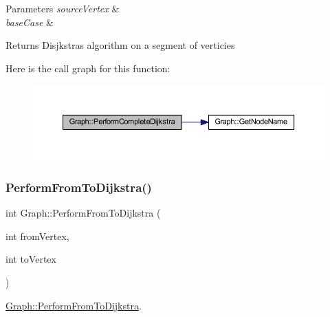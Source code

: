 \begin{DoxyParams}{Parameters}
{\em source\+Vertex} & \\
\hline
{\em base\+Case} & \\
\hline
\end{DoxyParams}
\begin{DoxyReturn}{Returns}
Disjkstra\textquotesingle{}s algorithm on a segment of verticies 
\end{DoxyReturn}
Here is the call graph for this function\+:
\nopagebreak
\begin{figure}[H]
\begin{center}
\leavevmode
\includegraphics[width=350pt]{class_graph_a3bb92a2d9cba33ba8e960eccb9c34f78_cgraph}
\end{center}
\end{figure}
\mbox{\label{class_graph_a3b0a495ac7703b4b7f12dc8e6e490f3b}} 
\subsubsection{\texorpdfstring{Perform\+From\+To\+Dijkstra()}{PerformFromToDijkstra()}}
{\footnotesize\ttfamily int Graph\+::\+Perform\+From\+To\+Dijkstra (\begin{DoxyParamCaption}\item[{int}]{from\+Vertex,  }\item[{int}]{to\+Vertex }\end{DoxyParamCaption})}



\mbox{\hyperlink{class_graph_a3b0a495ac7703b4b7f12dc8e6e490f3b}{Graph\+::\+Perform\+From\+To\+Dijkstra}}. 



